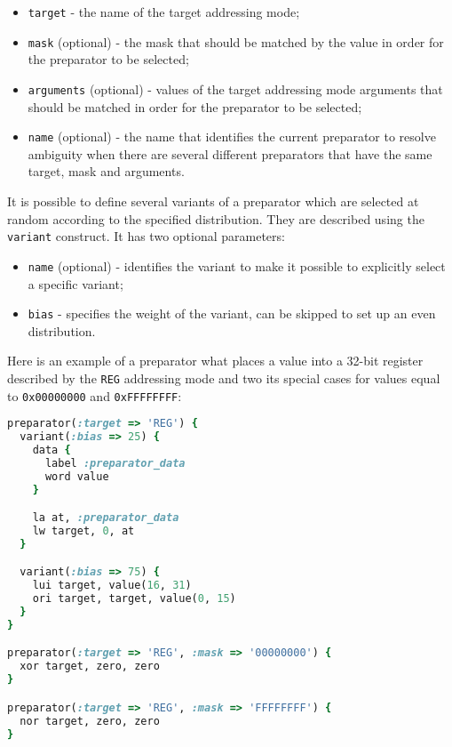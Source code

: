 \documentclass[oneside,final,12pt]{extreport}
\begin{document}
\begin{itemize}
\item {\tt target} - the name of the target addressing mode;
\item {\tt mask} (optional) - the mask that should be matched by the value in order for the
       preparator to be selected;
\item {\tt arguments} (optional) - values of the target addressing mode arguments that should
      be matched in order for the preparator to be selected;
\item {\tt name} (optional) - the name that identifies the current preparator to resolve ambiguity
      when there are several different preparators that have the same target, mask and arguments.
\end{itemize}

It is possible to define several variants of a preparator which are selected at random according to
the specified distribution. They are described using the {\tt variant} construct. It has two
optional parameters:

\begin{itemize}
\item {\tt name} (optional) - identifies the variant to make it possible to explicitly select
      a specific variant;
\item {\tt bias} - specifies the weight of the variant, can be skipped to set up an even
      distribution.
\end{itemize}

Here is an example of a preparator what places a value into a 32-bit register described by
the {\tt REG} addressing mode and two its special cases for values equal to {\tt 0x00000000}
and {\tt 0xFFFFFFFF}:

\begin{lstlisting}[language=ruby, emph={preparator, variant, data}]
preparator(:target => 'REG') {
  variant(:bias => 25) {
    data {
      label :preparator_data
      word value
    }

    la at, :preparator_data
    lw target, 0, at
  }

  variant(:bias => 75) {
    lui target, value(16, 31)
    ori target, target, value(0, 15)
  }
}

preparator(:target => 'REG', :mask => '00000000') {
  xor target, zero, zero
}

preparator(:target => 'REG', :mask => 'FFFFFFFF') {
  nor target, zero, zero
}
\end{lstlisting}
\end{document}
